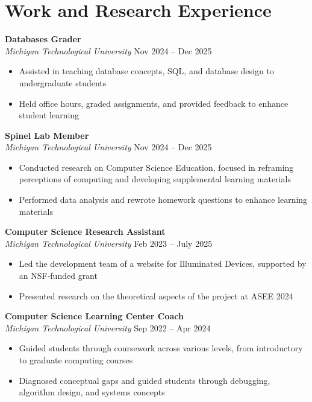 \section*{Work and Research Experience}

\textbf{Databases Grader} \\
\textit{Michigan Technological University} \hfill Nov 2024 – Dec 2025
\begin{itemize}[itemsep=0.05em]
    \item Assisted in teaching database concepts, SQL, and database design to undergraduate students
    \item Held office hours, graded assignments, and provided feedback to enhance student learning
\end{itemize}

\textbf{Spinel Lab Member} \\
\textit{Michigan Technological University} \hfill Nov 2024 – Dec 2025
\begin{itemize}[itemsep=0.05em]
    \item Conducted research on Computer Science Education, focused in reframing perceptions of computing and developing supplemental learning materials
    \item Performed data analysis and rewrote homework questions to enhance learning materials
\end{itemize}

\textbf{Computer Science Research Assistant} \\
\textit{Michigan Technological University} \hfill Feb 2023 – July 2025 
\begin{itemize}[itemsep=0.05em]
    \item Led the development team of a website for Illuminated Devices, supported by an NSF-funded grant
    \item Presented research on the theoretical aspects of the project at ASEE 2024
\end{itemize}

\textbf{Computer Science Learning Center Coach} \\
\textit{Michigan Technological University} \hfill Sep 2022 – Apr 2024
\begin{itemize}[itemsep=0.05em]
    \item Guided students through coursework across various levels, from introductory to graduate computing courses
    \item Diagnosed conceptual gaps and guided students through debugging, algorithm design, and systems concepts
\end{itemize}

